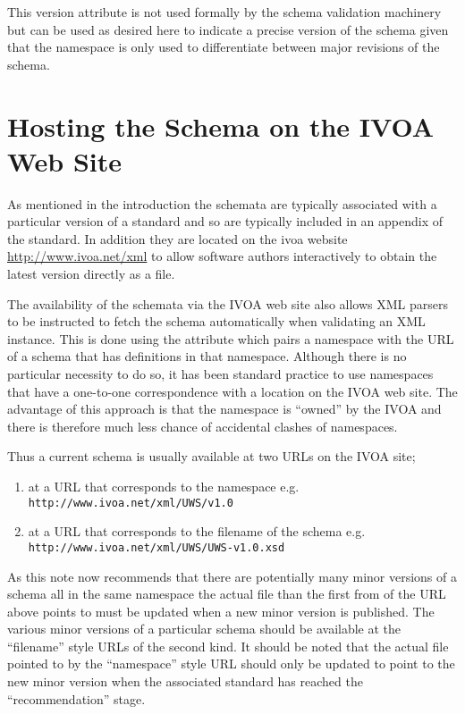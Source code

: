 \documentclass[10pt,a4paper]{ivoa}
\begin{document}
This version attribute is not used formally by the schema validation machinery
but can be used as desired here to indicate a precise version of the schema
given that the namespace is only used to differentiate between major revisions
of the schema.



\section{Hosting the Schema on the IVOA Web Site}
As mentioned in the introduction the schemata are typically associated with a
particular version of a standard and so are typically included in an appendix of
the standard. In addition they are located on the ivoa website
\url{http://www.ivoa.net/xml} to allow software authors interactively to
obtain the latest version directly as a file.

The availability of the schemata via the IVOA web site also
allows XML parsers to be instructed to fetch the schema automatically when
validating an XML instance. This is done using the 
attribute which pairs a namespace with the URL of a schema that has definitions
in that namespace. Although there is no particular necessity to do so, it has
been standard practice to use namespaces that have a one-to-one correspondence
with a location on the IVOA web site. The advantage of this approach is that the
namespace is ``owned'' by the IVOA and there is therefore much less chance of
accidental clashes of namespaces.

Thus a current schema is usually available at two URLs on the IVOA site;
\begin{enumerate}
  \item at a URL that corresponds to the namespace \newline e.g.
  \texttt{http://www.ivoa.net/xml/UWS/v1.0}
  \item at a URL that corresponds to the filename of the schema \newline e.g.
  \texttt{http://www.ivoa.net/xml/UWS/UWS-v1.0.xsd}
\end{enumerate}

As this note now recommends that there are potentially many minor versions of a
schema all in the same namespace the actual file than the first from of the URL
above points to must be updated when a new minor version is published. The
various minor versions of a particular schema should be available at the
``filename'' style URLs of the second kind. It should be noted that the
actual file pointed to by the ``namespace'' style URL should only be updated to
point to the new minor version when the associated standard has reached the
``recommendation'' stage.
\end{document}
